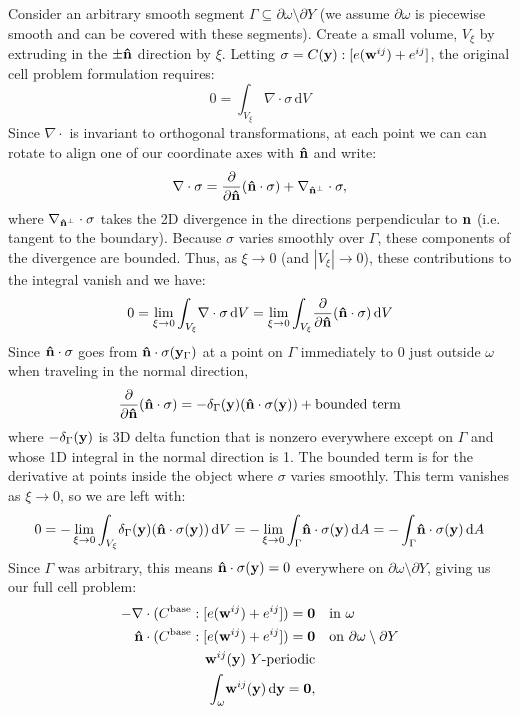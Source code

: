 \documentclass[10pt]{article}
\providecommand{\pder}[2]{\frac{\partial #1}{\partial #2}}
\begin{document}
Consider an arbitrary smooth segment $\Gamma \subseteq \partial \omega \setminus
\partial Y$ (we assume
$\partial \omega$ is piecewise smooth and can be covered with these segments).
Create a small volume, $V_\xi$ by extruding in the $\pm \bf \hat{n}$ direction
by $\xi$. Letting $\sigma = C({\bf y}) : [e({\bf w}^{ij}) + e^{ij}]$, the
original cell problem formulation requires:
$$
0 = \int_{V_\xi} \! \nabla \cdot \sigma \, \mathrm{d} V
$$
Since $\nabla \cdot$ is invariant to orthogonal transformations, at each point
we can can rotate to align one of our coordinate axes with ${\bf \hat{n}}$ and write:
$$
\nabla \cdot \sigma = \pder{}{\bf \hat{n}}({\bf \hat n} \cdot \sigma)  + \nabla_{{\bf \hat n}^\perp} \cdot \sigma,
$$
where $\nabla_{{\bf \hat n}^\perp} \cdot \sigma$ takes the 2D divergence in the
directions perpendicular to ${\bf n}$ (i.e. tangent to the boundary). Because
$\sigma$ varies smoothly over $\Gamma$, these components of the divergence are
bounded. Thus, as $\xi \to 0$ (and $|V_\xi| \to 0$), these contributions to the
integral vanish and we have:
$$
0 = \lim_{\xi \to 0} \int_{V_\xi} \! \nabla \cdot \sigma \, \mathrm{d} V  =
    \lim_{\xi \to 0} \int_{V_\xi} \! \pder{}{\bf \hat{n}}({\bf \hat n} \cdot \sigma) \, \mathrm{d} V
$$
Since ${\bf \hat n} \cdot \sigma$ goes from ${\bf \hat n} \cdot \sigma({\bf
y}_\Gamma)$ at a point on $\Gamma$ immediately to $0$ just outside $\omega$
when traveling in the normal direction,
$$
\pder{}{\bf \hat{n}}({\bf \hat n} \cdot \sigma) =
-\delta_\Gamma({\bf y}) ({\bf \hat n} \cdot \sigma({\bf y})) + \text{bounded term}
$$
where $-\delta_\Gamma({\bf y})$ is 3D delta function that is nonzero everywhere
except on $\Gamma$ and whose 1D integral in the normal direction is 1. The bounded
term is for the derivative at points inside the object where $\sigma$ varies
smoothly. This term vanishes as $\xi \to 0$, so we are left with:
$$
0 = -\lim_{\xi \to 0} \int_{V_\xi} \! \delta_\Gamma({\bf y}) ({\bf \hat n} \cdot \sigma({\bf y})) \, \mathrm{d} V =
    -\lim_{\xi \to 0} \int_{\Gamma} \! {\bf \hat n} \cdot \sigma({\bf y}) \, \mathrm{d} A =
    -\int_{\Gamma} \! {\bf \hat n} \cdot \sigma({\bf y}) \, \mathrm{d} A
$$
Since $\Gamma$ was arbitrary, this means ${\bf \hat n} \cdot \sigma({\bf y}) = 0$
everywhere on $\partial \omega \setminus \partial Y$, giving us our full cell
problem:
\begin{align*}
     -\nabla \cdot (C^\text{base} : [e({\bf w}^{ij}) + e^{ij}]) = {\bf 0} & \quad \text{in } \omega \\
{\bf \hat n} \cdot (C^\text{base} : [e({\bf w}^{ij}) + e^{ij}]) = {\bf 0} & \quad \text{on } \partial \omega \setminus \partial Y \\
    {\bf w}^{ij}({\bf y})\ Y \text{-periodic} & \\
    \int_\omega \! {\bf w}^{ij}({\bf y})  \, \mathrm{d} {\bf y} =  {\bf 0}, 
\end{align*}
\end{document}
